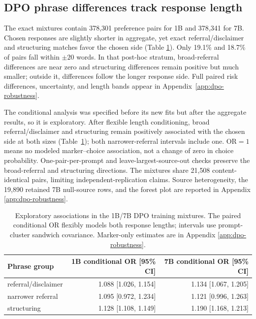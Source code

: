 \documentclass[11pt]{article}
\begin{document}
\subsection{DPO phrase differences track response length}
\label{sec:datalayers}

The exact mixtures contain 378{,}301 preference pairs for 1B and 378{,}341 for
7B. Chosen responses are slightly shorter in aggregate, yet exact
referral/disclaimer and structuring matches favor the chosen side (Table
\ref{tab:dpo}). Only 19.1\% and 18.7\% of pairs fall within $\pm20$ words. In
that post-hoc stratum, broad-referral differences are near zero and structuring
differences remain positive but much smaller; outside it, differences follow
the longer response side. Full paired risk differences, uncertainty, and length
bands appear in Appendix~\ref{app:dpo-robustness}.

The conditional analysis was specified before its new fits but after the
aggregate results, so it is exploratory. After flexible length conditioning,
broad referral/disclaimer and structuring remain positively associated with the
chosen side at both sizes (Table~\ref{tab:dpo}); both narrower-referral
intervals include one. OR${}=1$ means no modeled marker--choice association,
not a change of zero in choice probability. One-pair-per-prompt and
leave-largest-source-out checks preserve the broad-referral and structuring
directions. The mixtures share 21{,}508 content-identical pairs, limiting
independent-replication claims. Source heterogeneity, the 19{,}890 retained 7B
null-source rows, and the forest plot are reported in Appendix
\ref{app:dpo-robustness}.

\begin{table}[t]
\centering
\small
\setlength{\tabcolsep}{3pt}
\begin{tabular}{@{}lrr@{}}
\toprule
Phrase group & 1B conditional OR [95\% CI] & 7B conditional OR [95\% CI] \\
\midrule
referral/disclaimer & 1.088 [1.026, 1.154] & 1.134 [1.067, 1.205] \\
narrower referral & 1.095 [0.972, 1.234] & 1.121 [0.996, 1.263] \\
structuring & 1.128 [1.108, 1.149] & 1.190 [1.168, 1.213] \\
\bottomrule
\end{tabular}
\caption{Exploratory associations in the 1B/7B DPO training mixtures. The
paired conditional OR flexibly models both response lengths; intervals use
prompt-cluster sandwich covariance. Marker-only estimates are in Appendix
\ref{app:dpo-robustness}.}
\label{tab:dpo}
\end{table}
\end{document}
